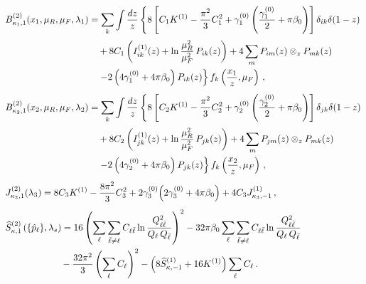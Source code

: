 \begin{subequations}
\label{eq:C21-ingred}
\begin{align}
&B_{\kappa_{1},1}^{(2)}(x_1,\mu_R,\mu_F,\lambda_1) = \sum_{k}\int\frac{dz}{z}
   \left\{8 \left[C_1 K^{(1)}-\frac{\pi^2}{3}C_1^2
    +\gamma_1^{(0)}\left(\frac{\gamma_1^{(0)}}{2}+\pi\beta_0\right)\right]
    \delta_{ik}\delta(1-z) \right.\notag\\[0.5ex]
  &\qquad\qquad\qquad\qquad\qquad+8C_1\left(I_{ik}^{(1)}(z)+\ln\frac{\mu_R^2}{\mu_F^2}\,P_{ik}(z)\right)
    +4\sum_m P_{im}(z)\otimes_z P_{mk}(z)\notag\\
    &\qquad\qquad\qquad\qquad\qquad\left.-2\left(4\gamma_1^{(0)}+4\pi\beta_0\right)P_{ik}(z)\right\}f_k\left(\frac{x_1}{z},\mu_F\right)\,, \\[1ex]
&B_{\kappa_{2},1}^{(2)}(x_2,\mu_R,\mu_F,\lambda_2) = \sum_{k}\int\frac{dz}{z}
   \left\{8 \left[C_2 K^{(1)}-\frac{\pi^2}{3}C_2^2
    +\gamma_2^{(0)}\left(\frac{\gamma_2^{(0)}}{2}+\pi\beta_0\right)\right]
    \delta_{jk}\delta(1-z) \right.\notag\\[0.5ex]
  &\qquad\qquad\qquad\qquad\qquad+8C_2\left(I_{jk}^{(1)}(z)+\ln\frac{\mu_R^2}{\mu_F^2}\,P_{jk}(z)\right)
    +4\sum_m P_{jm}(z)\otimes_z P_{mk}(z)\notag\\
    &\qquad\qquad\qquad\qquad\qquad\left.-2\left(4\gamma_2^{(0)}+4\pi\beta_0\right)P_{jk}(z)\right\}f_k\left(\frac{x_2}{z},\mu_F\right)\,, \\[1ex]
    &J_{\kappa_3,1}^{(2)}(\lambda_3) = 8C_3 K^{(1)}-\frac{8\pi^2}{3}C_3^2
    +2\gamma_3^{(0)}\!\left(2\gamma_3^{(0)}+4\pi\beta_0\right)
    +4C_3 J_{\kappa_3,-1}^{(1)}\,, \\[1ex]
&\widehat{S}_{\kappa,1}^{(2)}\left(\{\hat{p}_{\ell}\},\lambda_s\right) =16\left(\sum_{\ell}\sum_{\bar{\ell}\neq\ell}C_{\ell\bar\ell}\ln\frac{Q_{\ell\bar{\ell}}^2}{Q_{\ell}\,Q_{\bar{\ell}}}\right)^2
-32\pi\beta_0\sum_{\ell}\sum_{\bar{\ell}\neq\ell}C_{\ell\bar\ell}\ln\frac{Q_{\ell\bar{\ell}}^2}{Q_{\ell}\,Q_{\bar{\ell}}}\notag\\
&\qquad\qquad\qquad -\frac{32\pi^2}{3}\left(\sum_{\ell}C_{\ell}\right)^2-\left(8\widehat{S}_{\kappa,-1}^{(1)}+16K^{(1)}\right)\sum_{\ell}C_{\ell}\,.
\end{align}
\end{subequations}

